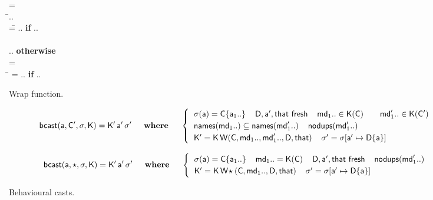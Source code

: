 \documentclass[acmlarge, anonymous, authordraft]{acmart}
\begin{document}
\begin{figure}[!ht]
\hrulefill
\small

\begin{tabbing}
  \wrap{}\D\that = \\
  \HS\HS\WHERE\HS\= \Mdef\m{}\e\In{}.. \\
                 \>  =\=  ..
    \HS \= \textbf{if} \HS \Mdef\m{}\ep\In{}.. \\
\\[-3mm]
\> \>   ..  \>\textbf{otherwise}
\\[3mm]
   = \\
\HS\HS\WHERE\HS\= = \src{ \Mdef\m\x{\any}{\any}{~\BehCast\any{ \KCall{\FRead\that} \m {\bscast{\t}\x}{\t}{\tp}} } }   ..
    \HS\HS\HS\HS \= \textbf{if} \HS \Mdef\m\x{\t}{\tp}\e\In{}.. \\
\end{tabbing}
\vspace{-5mm}


\hrulefill
\vspace{-2mm}
\caption{Wrap function.}\label{behavetext}
\end{figure}

\begin{figure}[!ht]
\hrulefill
\small

\begin{equation*}
  \behcastE\a\Cp\s\K \Kp\ap\sp \HS\HS\WHERE\HS\HS \begin{cases}
\HS  \App\s\a = \obj\C{\a_1..} \HS\HS
  \fresh{\D,\ap,\that} \HS\HS
  \mds 1.. \In \App\K\C \qquad \mdps 1.. \In \App\K\Cp \\\HS
  \names{\mds 1..} \subseteq \names{\mdps 1..} \HS\HS \cload{\mdps 1..} \\\HS
  \Kp = \K\,\wrap\C{\mds 1..}{\mdps 1..}\D\that \HS\HS
  \sp = \Map \s{\Bind\ap{\obj\D{\a}}} 
  \end{cases}
\end{equation*}

\begin{equation*}
  \behcastE\a\any\s\K \Kp\ap\sp  \HS\HS\WHERE\HS\HS\begin{cases}\HS
  \App\s\a = \obj\C{\a_1..} \HS\HS \mds 1.. = \App\K\C \HS\HS
  \fresh{\D,\ap,\that} \HS\HS \cload{\mdps 1..} \\\HS
  \Kp = \K\,\wrapAny\C{\mds 1..}\D\that \HS\HS
  \sp = \Map \s{\Bind\ap{\obj\D{\a}}} 
\end{cases}\end{equation*}


\hrulefill
\vspace{-2mm}
\caption{Behavioural casts.}\label{behavetext}
\end{figure}
\end{document}
